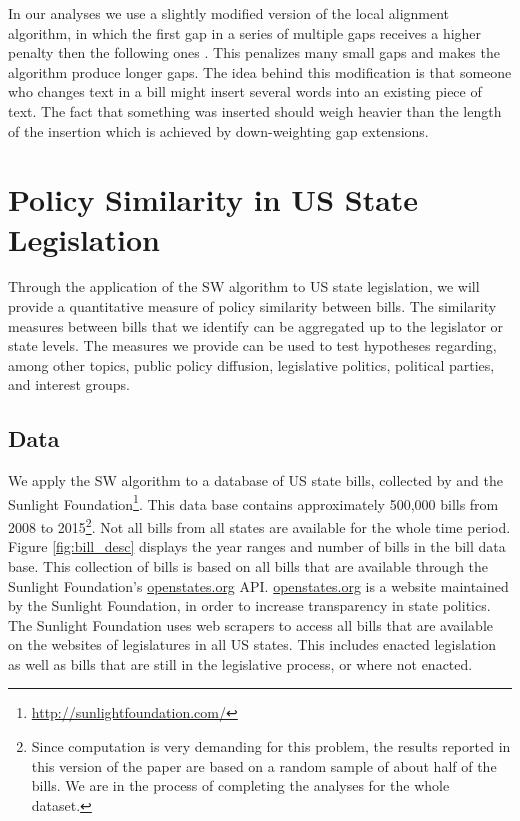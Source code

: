 \documentclass[12pt]{article} %
\begin{document}
In our analyses we use a slightly modified version of the local alignment algorithm, in which the first gap in a series of multiple gaps receives a higher penalty then the following ones \citep[][use the same modification]{wilkerson2015tracing}. This penalizes many small gaps and makes the algorithm produce longer gaps. The idea behind this modification is that someone who changes text in a bill might insert several words into an existing piece of text. The fact that something was inserted should weigh heavier than the length of the insertion which is achieved by down-weighting gap extensions. 




\section{Policy Similarity in US State Legislation}
Through the application of the SW algorithm to US state legislation, we will
provide a quantitative measure of policy similarity between bills. The
similarity measures between bills  that we identify can be aggregated up to the legislator or state levels. The measures we provide can be used to test hypotheses regarding, among other topics, public policy diffusion, legislative politics, political parties, and interest groups.  

\subsection{Data}
We apply the SW algorithm to a database of US state bills, collected by
\citet{burgess2016legislative} and the Sunlight
Foundation\footnote{\url{http://sunlightfoundation.com/}}. This data base
contains approximately 500,000 bills from 2008 to 2015\footnote{Since
    computation is very demanding for this problem, the results reported in this
    version of the paper are based on a random sample of about half of the
    bills. We are in the process of completing the analyses for the whole
dataset.}. Not all bills from all
states are available for the whole time period. Figure \ref{fig:bill_desc}
displays the year ranges and number of bills in the bill data base. This
collection of bills is based on all bills that are available through the
Sunlight Foundation's \url{openstates.org} API. \url{openstates.org} is a website maintained by the Sunlight Foundation, in order to increase transparency in state politics. The Sunlight Foundation uses web scrapers to access all bills that are available on the websites of legislatures in all US states. This includes enacted legislation as well as bills that are still in the legislative process, or where not enacted. %
\end{document}
